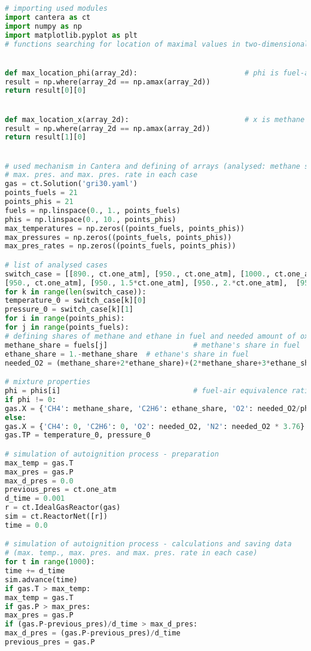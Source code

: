 \begin{lstlisting}[language=Python]
# importing used modules
import cantera as ct
import numpy as np
import matplotlib.pyplot as plt
# functions searching for location of maximal values in two-dimensional array


def max_location_phi(array_2d):                         # phi is fuel-air equivalence ratio
result = np.where(array_2d == np.amax(array_2d))
return result[0][0]


def max_location_x(array_2d):                           # x is methane's share in fuel (in loop named also 'fuels')
result = np.where(array_2d == np.amax(array_2d))
return result[1][0]


# used mechanism in Cantera and defining of arrays (analysed: methane shares, fuel-air ratios, max. temp.,
# max. pres. and max. pres. rate in each case
gas = ct.Solution('gri30.yaml')
points_fuels = 21
points_phis = 21
fuels = np.linspace(0., 1., points_fuels)
phis = np.linspace(0., 10., points_phis)
max_temperatures = np.zeros((points_fuels, points_phis))
max_pressures = np.zeros((points_fuels, points_phis))
max_pres_rates = np.zeros((points_fuels, points_phis))

# list of analysed cases
switch_case = [[890., ct.one_atm], [950., ct.one_atm], [1000., ct.one_atm],  [1050., ct.one_atm],  [1100., ct.one_atm],
[950., ct.one_atm], [950., 1.5*ct.one_atm], [950., 2.*ct.one_atm],  [950., 3*ct.one_atm]]
for k in range(len(switch_case)):
temperature_0 = switch_case[k][0]
pressure_0 = switch_case[k][1]
for i in range(points_phis):
for j in range(points_fuels):
# defining shares of methane and ethane in fuel and needed amount of oxygen for stoichiometric mixture
methane_share = fuels[j]                    # methane's share in fuel
ethane_share = 1.-methane_share  # ethane's share in fuel
needed_O2 = (methane_share+2*ethane_share)+(2*methane_share+3*ethane_share)/2

# mixture properties
phi = phis[i]                               # fuel-air equivalence ratio
if phi != 0:
gas.X = {'CH4': methane_share, 'C2H6': ethane_share, 'O2': needed_O2/phi, 'N2': needed_O2*3.76/phi}
else:
gas.X = {'CH4': 0, 'C2H6': 0, 'O2': needed_O2, 'N2': needed_O2 * 3.76}
gas.TP = temperature_0, pressure_0

# simulation of autoignition process - preparation
max_temp = gas.T
max_pres = gas.P
max_d_pres = 0.0
previous_pres = ct.one_atm
d_time = 0.001
r = ct.IdealGasReactor(gas)
sim = ct.ReactorNet([r])
time = 0.0

# simulation of autoignition process - calculations and saving data
# (max. temp., max. pres. and max. pres. rate in each case)
for t in range(1000):
time += d_time
sim.advance(time)
if gas.T > max_temp:
max_temp = gas.T
if gas.P > max_pres:
max_pres = gas.P
if (gas.P-previous_pres)/d_time > max_d_pres:
max_d_pres = (gas.P-previous_pres)/d_time
previous_pres = gas.P


\end{lstlisting}
